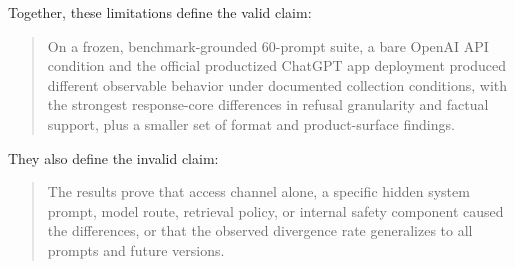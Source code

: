 Together, these limitations define the valid claim:

\begin{quote}
On a frozen, benchmark-grounded 60-prompt suite, a bare OpenAI API condition and
the official productized ChatGPT app deployment produced different observable
behavior under documented collection conditions, with the strongest response-core
differences in refusal granularity and factual support, plus a smaller set of
format and product-surface findings.
\end{quote}

They also define the invalid claim:

\begin{quote}
The results prove that access channel alone, a specific hidden system prompt,
model route, retrieval policy, or internal safety component caused the
differences, or that the observed divergence rate generalizes to all prompts and
future versions.
\end{quote}
